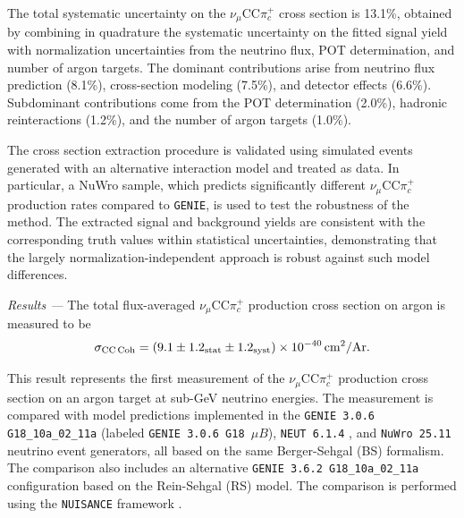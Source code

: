 \documentclass[aps,prl,reprint,superscriptaddress,nofootinbib, showpacs]{revtex4-2}
\begin{document}
The total systematic uncertainty on the $\nu_\mu$CC$\pi^+_c$ cross section is 13.1\%, obtained by combining in quadrature the systematic uncertainty on the fitted signal yield with normalization uncertainties from the neutrino flux, POT determination, and number of argon targets. The dominant contributions arise from neutrino flux prediction (8.1\%), cross-section modeling (7.5\%), and detector effects (6.6\%). Subdominant contributions come from the POT determination (2.0\%), hadronic reinteractions (1.2\%), and the number of argon targets (1.0\%).

The cross section extraction procedure is validated using simulated events generated with an alternative interaction model and treated as data. In particular, a NuWro sample, which predicts significantly different $\nu_\mu$CC$\pi^+_c$ production rates compared to \texttt{GENIE}, is used to test the robustness of the method. The extracted signal and background yields are consistent with the corresponding truth values within statistical uncertainties, demonstrating that the largely normalization-independent approach is robust against such model differences.

\textit{Results ---} The total flux-averaged $\nu_\mu$CC$\pi^+_c$ production cross section on argon is measured to be
\begin{equation*}
    \sigma_{\text{CC\,Coh}} = (9.1 \pm 1.2 _{\text{stat}} \pm 1.2_\text{syst}) \times 10^{-40}\,\text{cm}^{2}/\text{Ar.}
\end{equation*}

This result represents the first measurement of the $\nu_\mu$CC$\pi^+_c$ production cross section on an argon target at sub-GeV neutrino energies. The measurement is compared with model predictions implemented in the \texttt{GENIE 3.0.6 G18\_10a\_02\_11a} \cite{MicroBooNE_Tune} (labeled \texttt{GENIE 3.0.6 G18 $\mu B$}), \texttt{NEUT 6.1.4} \cite{Hayato2021NEUT}, and \texttt{NuWro 25.11} \cite{Golan2012FSI} neutrino event generators, all based on the same Berger-Sehgal (BS) formalism. The comparison also includes an alternative \texttt{GENIE 3.6.2 G18\_10a\_02\_11a} configuration based on the Rein-Sehgal (RS) model. The comparison is performed using the \texttt{NUISANCE} framework \cite{Stowell_2017}.
\end{document}
